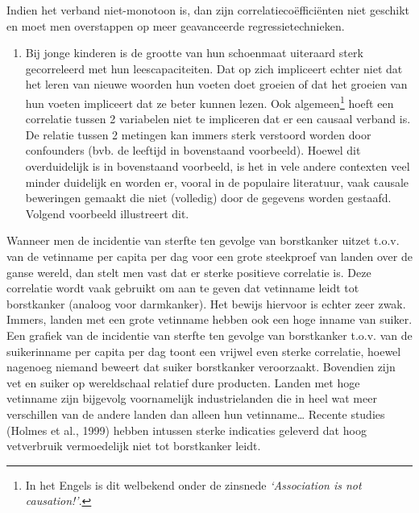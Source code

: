 \documentclass[12pt,dutch,coursenotes]{book}
\providecommand{\tightlist}{%
  \setlength{\itemsep}{0pt}\setlength{\parskip}{0pt}}
\let\rmarkdownfootnote\footnote%
\def\footnote{\protect\rmarkdownfootnote}
\theoremstyle{definition}
\theoremstyle{definition}
\theoremstyle{definition}
\theoremstyle{remark}
\let\BeginKnitrBlock\begin \let\EndKnitrBlock\end
\begin{document}
Indien het verband niet-monotoon is, dan zijn correlatiecoëfficiënten
niet geschikt en moet men overstappen op meer geavanceerde
regressietechnieken.

\begin{enumerate}
\def\labelenumi{\arabic{enumi}.}
\setcounter{enumi}{2}
\tightlist
\item
  Bij jonge kinderen is de grootte van hun schoenmaat uiteraard sterk
  gecorreleerd met hun leescapaciteiten. Dat op zich impliceert echter
  niet dat het leren van nieuwe woorden hun voeten doet groeien of dat
  het groeien van hun voeten impliceert dat ze beter kunnen lezen. Ook
  algemeen\footnote{In het Engels is dit welbekend onder de zinsnede
    \emph{`Association is not causation!'}.} hoeft een correlatie tussen
  2 variabelen niet te impliceren dat er een causaal verband is. De
  relatie tussen 2 metingen kan immers sterk verstoord worden door
  confounders (bvb. de leeftijd in bovenstaand voorbeeld). Hoewel dit
  overduidelijk is in bovenstaand voorbeeld, is het in vele andere
  contexten veel minder duidelijk en worden er, vooral in de populaire
  literatuur, vaak causale beweringen gemaakt die niet (volledig) door
  de gegevens worden gestaafd. Volgend voorbeeld illustreert dit.
\end{enumerate}

\BeginKnitrBlock{example}[Associatie versus causatie]
\protect\hypertarget{exm:unnamed-chunk-61}{}{\label{exm:unnamed-chunk-61}
\iffalse (Associatie versus causatie) \fi{} }
\EndKnitrBlock{example}

Wanneer men de incidentie van sterfte ten gevolge van borstkanker uitzet
t.o.v. van de vetinname per capita per dag voor een grote steekproef van
landen over de ganse wereld, dan stelt men vast dat er sterke positieve
correlatie is. Deze correlatie wordt vaak gebruikt om aan te geven dat
vetinname leidt tot borstkanker (analoog voor darmkanker). Het bewijs
hiervoor is echter zeer zwak. Immers, landen met een grote vetinname
hebben ook een hoge inname van suiker. Een grafiek van de incidentie van
sterfte ten gevolge van borstkanker t.o.v. van de suikerinname per
capita per dag toont een vrijwel even sterke correlatie, hoewel nagenoeg
niemand beweert dat suiker borstkanker veroorzaakt. Bovendien zijn vet
en suiker op wereldschaal relatief dure producten. Landen met hoge
vetinname zijn bijgevolg voornamelijk industrielanden die in heel wat
meer verschillen van de andere landen dan alleen hun vetinname\ldots{}
Recente studies (Holmes et al., 1999) hebben intussen sterke indicaties
geleverd dat hoog vetverbruik vermoedelijk niet tot borstkanker leidt.
\end{document}
